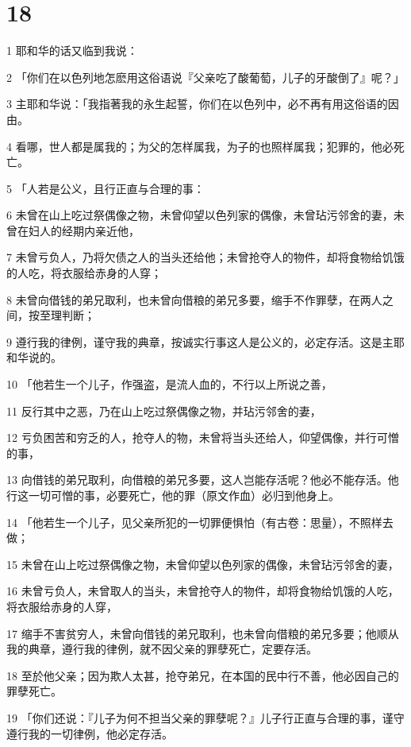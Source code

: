 \chapter{18}

\par 1 耶和华的话又临到我说：
\par 2 「你们在以色列地怎麽用这俗语说『父亲吃了酸葡萄，儿子的牙酸倒了』呢？」
\par 3 主耶和华说：「我指著我的永生起誓，你们在以色列中，必不再有用这俗语的因由。
\par 4 看哪，世人都是属我的；为父的怎样属我，为子的也照样属我；犯罪的，他必死亡。
\par 5 「人若是公义，且行正直与合理的事：
\par 6 未曾在山上吃过祭偶像之物，未曾仰望以色列家的偶像，未曾玷污邻舍的妻，未曾在妇人的经期内亲近他，
\par 7 未曾亏负人，乃将欠债之人的当头还给他；未曾抢夺人的物件，却将食物给饥饿的人吃，将衣服给赤身的人穿；
\par 8 未曾向借钱的弟兄取利，也未曾向借粮的弟兄多要，缩手不作罪孽，在两人之间，按至理判断；
\par 9 遵行我的律例，谨守我的典章，按诚实行事这人是公义的，必定存活。这是主耶和华说的。
\par 10 「他若生一个儿子，作强盗，是流人血的，不行以上所说之善，
\par 11 反行其中之恶，乃在山上吃过祭偶像之物，并玷污邻舍的妻，
\par 12 亏负困苦和穷乏的人，抢夺人的物，未曾将当头还给人，仰望偶像，并行可憎的事，
\par 13 向借钱的弟兄取利，向借粮的弟兄多要，这人岂能存活呢？他必不能存活。他行这一切可憎的事，必要死亡，他的罪（原文作血）必归到他身上。
\par 14 「他若生一个儿子，见父亲所犯的一切罪便惧怕（有古卷：思量），不照样去做；
\par 15 未曾在山上吃过祭偶像之物，未曾仰望以色列家的偶像，未曾玷污邻舍的妻，
\par 16 未曾亏负人，未曾取人的当头，未曾抢夺人的物件，却将食物给饥饿的人吃，将衣服给赤身的人穿，
\par 17 缩手不害贫穷人，未曾向借钱的弟兄取利，也未曾向借粮的弟兄多要；他顺从我的典章，遵行我的律例，就不因父亲的罪孽死亡，定要存活。
\par 18 至於他父亲；因为欺人太甚，抢夺弟兄，在本国的民中行不善，他必因自己的罪孽死亡。
\par 19 「你们还说：『儿子为何不担当父亲的罪孽呢？』儿子行正直与合理的事，谨守遵行我的一切律例，他必定存活。
